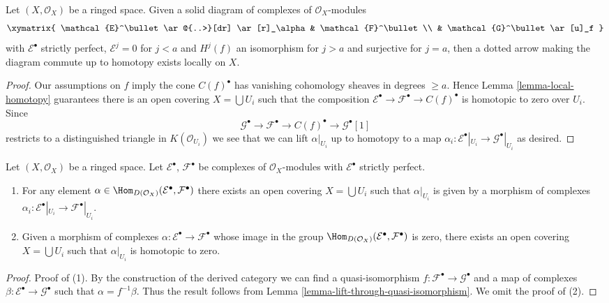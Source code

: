 \begin{lemma}
\label{lemma-lift-through-quasi-isomorphism}
Let $(X, \mathcal{O}_X)$ be a ringed space.
Given a solid diagram of complexes of $\mathcal{O}_X$-modules
$$
\xymatrix{
\mathcal{E}^\bullet \ar@{..>}[dr] \ar[r]_\alpha & \mathcal{F}^\bullet \\
& \mathcal{G}^\bullet \ar[u]_f
}
$$
with $\mathcal{E}^\bullet$ strictly perfect, $\mathcal{E}^j = 0$ for
$j < a$ and $H^j(f)$ an isomorphism for $j > a$ and surjective for $j = a$,
then a dotted arrow making the diagram commute up to homotopy
exists locally on $X$.
\end{lemma}

\begin{proof}
Our assumptions on $f$ imply the cone $C(f)^\bullet$ has vanishing
cohomology sheaves in degrees $\geq a$.
Hence Lemma \ref{lemma-local-homotopy} guarantees there is an open
covering $X = \bigcup U_i$ such that the composition
$\mathcal{E}^\bullet \to \mathcal{F}^\bullet \to C(f)^\bullet$
is homotopic to zero over $U_i$. Since
$$
\mathcal{G}^\bullet \to \mathcal{F}^\bullet \to C(f)^\bullet \to
\mathcal{G}^\bullet[1]
$$
restricts to a distinguished triangle in $K(\mathcal{O}_{U_i})$
we see that we can lift $\alpha|_{U_i}$ up to homotopy to a map
$\alpha_i : \mathcal{E}^\bullet|_{U_i} \to \mathcal{G}^\bullet|_{U_i}$
as desired.
\end{proof}

\begin{lemma}
\label{lemma-local-actual}
Let $(X, \mathcal{O}_X)$ be a ringed space.
Let $\mathcal{E}^\bullet$, $\mathcal{F}^\bullet$ be complexes
of $\mathcal{O}_X$-modules with $\mathcal{E}^\bullet$ strictly perfect.
\begin{enumerate}
\item For any element
$\alpha \in \Hom_{D(\mathcal{O}_X)}(\mathcal{E}^\bullet, \mathcal{F}^\bullet)$
there exists an open covering $X = \bigcup U_i$ such that
$\alpha|_{U_i}$ is given by a morphism of complexes
$\alpha_i : \mathcal{E}^\bullet|_{U_i} \to \mathcal{F}^\bullet|_{U_i}$.
\item Given a morphism of complexes
$\alpha : \mathcal{E}^\bullet \to \mathcal{F}^\bullet$
whose image in the group
$\Hom_{D(\mathcal{O}_X)}(\mathcal{E}^\bullet, \mathcal{F}^\bullet)$
is zero, there exists an open covering $X = \bigcup U_i$ such that
$\alpha|_{U_i}$ is homotopic to zero.
\end{enumerate}
\end{lemma}

\begin{proof}
Proof of (1).
By the construction of the derived category we can find a quasi-isomorphism
$f : \mathcal{F}^\bullet \to \mathcal{G}^\bullet$ and a map of complexes
$\beta : \mathcal{E}^\bullet \to \mathcal{G}^\bullet$ such that
$\alpha = f^{-1}\beta$. Thus the result follows from
Lemma \ref{lemma-lift-through-quasi-isomorphism}.
We omit the proof of (2).
\end{proof}

